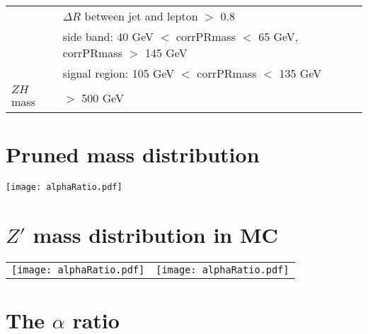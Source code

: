 \documentclass[a0,portrait]{a0poster}
\begin{document}
\begin{multicols}{2}
\begin{center}
\begin{small}
\begin{tabular}[t]{ | l | l | }
        & $\Delta R$ between jet and lepton $>$ 0.8      \\
        & side band: 40 GeV $<$ corrPRmass $<$ 65 GeV, corrPRmass $>$ 145 GeV \\
        & signal region: 105 GeV $<$ corrPRmass $<$ 135 GeV \\
        \hline
        $ZH$ mass                 
        & $>$ 500 GeV                                    \\
        \hline      
      \end{tabular}
    \end{small}
  \end{center}


  \section*{\color{Crimson} Pruned mass distribution}

  \begin{center}
    \texttt{[image: alphaRatio.pdf]}
  \end{center}
  

  \section*{\color{Crimson} $Z'$ mass distribution in MC}

  \begin{center}
    \begin{tabular}{ll}
      \texttt{[image: alphaRatio.pdf]} &
      \texttt{[image: alphaRatio.pdf]} \\
    \end{tabular}
  \end{center}

  
  \section*{\color{Crimson} The $\alpha$ ratio}
  

\end{multicols}
\end{document}
